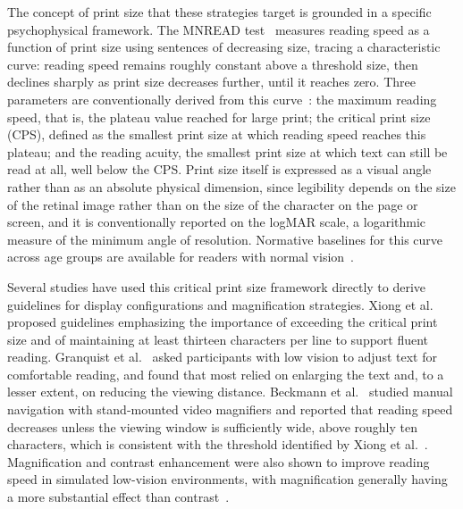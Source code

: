The concept of print size that these strategies target is grounded in a specific psychophysical framework. The MNREAD test~\cite{mansfield1993, legge1992psychophysics} measures reading speed as a function of print size using sentences of decreasing size, tracing a characteristic curve: reading speed remains roughly constant above a threshold size, then declines sharply as print size decreases further, until it reaches zero. Three parameters are conventionally derived from this curve~\cite{legge2006}: the maximum reading speed, that is, the plateau value reached for large print; the critical print size (CPS), defined as the smallest print size at which reading speed reaches this plateau; and the reading acuity, the smallest print size at which text can still be read at all, well below the CPS. Print size itself is expressed as a visual angle rather than as an absolute physical dimension, since legibility depends on the size of the retinal image rather than on the size of the character on the page or screen, and it is conventionally reported on the logMAR scale, a logarithmic measure of the minimum angle of resolution. Normative baselines for this curve across age groups are available for readers with normal vision~\cite{calabrese_baseline_2016}.

Several studies have used this critical print size framework directly to derive guidelines for display configurations and magnification strategies. Xiong et al.~\cite{xiong_digital_2022} proposed guidelines emphasizing the importance of exceeding the critical print size and of maintaining at least thirteen characters per line to support fluent reading. Granquist et al.~\cite{granquist_how_2018} asked participants with low vision to adjust text for comfortable reading, and found that most relied on enlarging the text and, to a lesser extent, on reducing the viewing distance. Beckmann et al.~\cite{beckmann_psychophysics_1996} studied manual navigation with stand-mounted video magnifiers and reported that reading speed decreases unless the viewing window is sufficiently wide, above roughly ten characters, which is consistent with the threshold identified by Xiong et al.~\cite{xiong_digital_2022}. Magnification and contrast enhancement were also shown to improve reading speed in simulated low-vision environments, with magnification generally having a more substantial effect than contrast~\cite{magnification-low-vision}.

